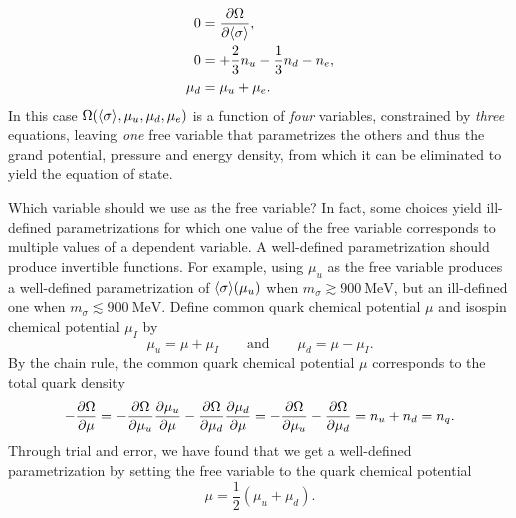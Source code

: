 \begin{subequations}
\begin{align}
	0 &= \pdv{\Omega}{ \langle \sigma \rangle} , \label{eq:lsm:minsys_min} \\
	0 &= +\frac23 n_u - \frac13 n_d - n_e , \label{eq:lsm:minsys_charge} \\
	\mu_d &= \mu_u + \mu_e . \label{eq:lsm:minsys_equilibrium}
\end{align}%
\label{eq:lsm:minsys}%
\end{subequations}%
In this case $\Omega(\langle \sigma \rangle,\mu_u,\mu_d,\mu_e)$ is a function of \emph{four} variables,
constrained by \emph{three} equations,
leaving \emph{one} free variable that parametrizes the others and thus the grand potential, pressure and energy density,
from which it can be eliminated to yield the equation of state.

Which variable should we use as the free variable?
In fact, some choices yield ill-defined parametrizations for which one value of the free variable corresponds to multiple values of a dependent variable.
A well-defined parametrization should produce invertible functions.
For example, using $\mu_u$ as the free variable produces a well-defined parametrization of $\langle \sigma \rangle(\mu_u)$ when $m_\sigma \gtrsim \SI{900}{\mega\electronvolt}$, but an ill-defined one when $m_\sigma \lesssim \SI{900}{\mega\electronvolt}$.
Define common quark chemical potential $\mu$ and isospin chemical potential $\mu_I$ by
\begin{equation}
	\mu_u = \mu + \mu_I
	\qquad \text{and} \qquad
	\mu_d = \mu - \mu_I .
\label{eq:lsm:quark_chemical_potential}
\end{equation}
By the chain rule, the common quark chemical potential $\mu$ corresponds to the total quark density
\begin{equation}
	-\pdv{\Omega}{\mu} = -\pdv{\Omega}{\mu_u} \pdv{\mu_u}{\mu} - \pdv{\Omega}{\mu_d} \pdv{\mu_d}{\mu} = -\pdv{\Omega}{\mu_u} - \pdv{\Omega}{\mu_d} = n_u + n_d = n_q .
\end{equation}
Through trial and error,  we have found that we get a well-defined parametrization by setting the free variable to the quark chemical potential
\begin{equation}
	\mu = \frac12 (\mu_u + \mu_d) .
\end{equation}

